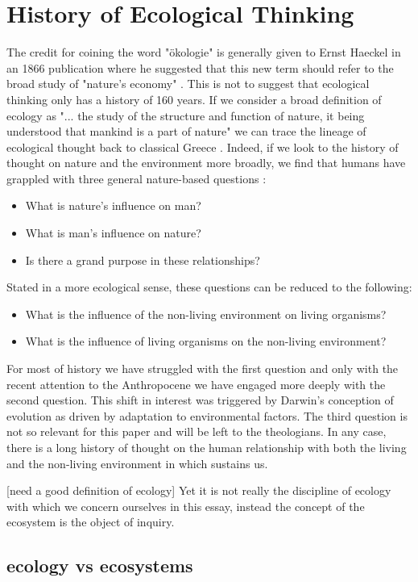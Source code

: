 \section {History of Ecological Thinking}

The credit for coining the word "ökologie" is generally given to Ernst Haeckel in an 1866 publication where he suggested that this new term should refer to the broad study of "nature's economy" \cite{worster_1977}. This is not to suggest that ecological thinking only has a history of 160 years. If we consider a broad definition of ecology as "... the study of the structure and function of nature, it being understood that mankind is a part of nature" we can trace the lineage of ecological thought back to classical Greece \cite{odum_1953}. Indeed, if we look to the history of thought on nature and the environment more broadly, we find that humans have grappled with three general nature-based questions \cite{glacken_1967}: \begin{itemize} \item What is nature's influence on man? \item What is man's influence on nature? \item Is there a grand purpose in these relationships? \end{itemize} Stated in a more ecological sense, these questions can be reduced to the following: \begin{itemize} \item What is the influence of the non-living environment on living organisms? \item What is the influence of living organisms on the non-living environment? \end{itemize} For most of history we have struggled with the first question and only with the recent attention to the Anthropocene we have engaged more deeply with the second question. This shift in interest was triggered by Darwin's conception of evolution as driven by adaptation to environmental factors. The third question is not so relevant for this paper and will be left to the theologians. In any case, there is a long history of thought on the human relationship with both the living and the non-living environment in which sustains us.

[need a good definition of ecology] Yet it is not really the discipline of ecology with which we concern ourselves in this essay, instead the concept of the ecosystem is the object of inquiry.

\subsection{ecology vs ecosystems}

